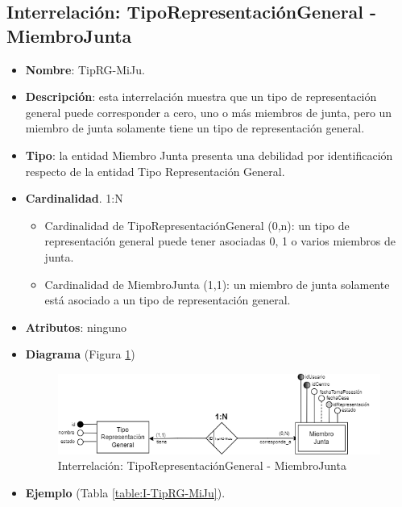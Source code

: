 \subsection{Interrelación: TipoRepresentaciónGeneral - MiembroJunta}
\begin{itemize}
    \item \textbf{Nombre}: TipRG-MiJu.
    \item \textbf{Descripción}: esta interrelación muestra que un tipo de representación general puede corresponder a cero, uno o más miembros de junta, pero un miembro de junta solamente tiene un tipo de representación general.
    \item \textbf{Tipo}: la entidad Miembro Junta presenta una debilidad por identificación respecto de la entidad Tipo Representación General.
    \item \textbf{Cardinalidad}. 1:N
    \begin{itemize}
        \item Cardinalidad de TipoRepresentaciónGeneral (0,n): un tipo de representación general puede tener asociadas 0, 1 o varios miembros de junta.
        \item Cardinalidad de MiembroJunta (1,1): un miembro de junta solamente está asociado a un tipo de representación general.
    \end{itemize}
    \item \textbf{Atributos}: ninguno
    \item \textbf{Diagrama} (Figura \ref{fig:I-TipRG-MiJu}) 
    \begin{figure}[H]
        \centering
        \includegraphics[scale=0.7]{img/diagramas/EER/I-TipRG-MiJu.png}
        \caption{Interrelación: TipoRepresentaciónGeneral - MiembroJunta}
        \label{fig:I-TipRG-MiJu}
    \end{figure}
    
    \item \textbf{Ejemplo} (Tabla \ref{table:I-TipRG-MiJu}).


\end{itemize}
